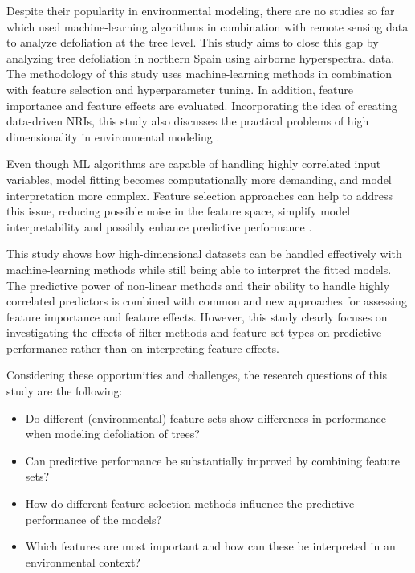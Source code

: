\documentclass[peerreview]{IEEEtran}
\begin{document}

Despite their popularity in environmental modeling, there are no studies so far which used machine-learning algorithms in combination with remote sensing data to analyze defoliation at the tree level.
This study aims to close this gap by analyzing tree defoliation in northern Spain using airborne hyperspectral data.
The methodology of this study uses machine-learning methods in combination with feature selection and hyperparameter tuning.
In addition, feature importance and feature effects are evaluated.
Incorporating the idea of creating data-driven \ac{NRI}s, this study also discusses the practical problems of high dimensionality in environmental modeling \cite{trunk1979, xu2016}.

Even though \ac{ML} algorithms are capable of handling highly correlated input variables, model fitting becomes computationally more demanding, and model interpretation more complex.
Feature selection approaches can help to address this issue, reducing possible noise in the feature space, simplify model interpretability and possibly enhance predictive performance \cite{cai2018}.

This study shows how high-dimensional datasets can be handled effectively with machine-learning methods while still being able to interpret the fitted models.
The predictive power of non-linear methods and their ability to handle highly correlated predictors is combined with common and new approaches for assessing feature importance and feature effects.
However, this study clearly focuses on investigating the effects of filter methods and feature set types on predictive performance rather than on interpreting feature effects.

Considering these opportunities and challenges, the research questions of this study are the following:

\begin{itemize}

	\item Do different (environmental) feature sets show differences in performance when modeling defoliation of trees?

	\item Can predictive performance be substantially improved by combining feature sets?

	\item How do different feature selection methods influence the predictive performance of the models?

	\item Which features are most important and how can these be interpreted in an environmental context?

\end{itemize}
\end{document}
